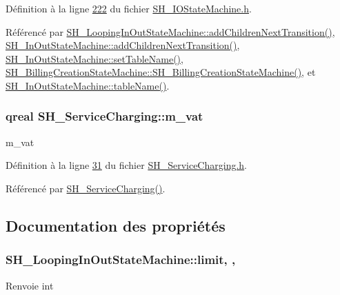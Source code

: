 Définition à la ligne \hyperlink{SH__IOStateMachine_8h_source_l00222}{222} du fichier \hyperlink{SH__IOStateMachine_8h_source}{S\-H\-\_\-\-I\-O\-State\-Machine.\-h}.



Référencé par \hyperlink{classSH__LoopingInOutStateMachine_abfae9f47019379f270496de46845c729}{S\-H\-\_\-\-Looping\-In\-Out\-State\-Machine\-::add\-Children\-Next\-Transition()}, \hyperlink{classSH__InOutStateMachine_aa78420f8778d7777809aad77eb8473b4}{S\-H\-\_\-\-In\-Out\-State\-Machine\-::add\-Children\-Next\-Transition()}, \hyperlink{classSH__InOutStateMachine_a95db31a7e7f31f36a8737adc739ab08c}{S\-H\-\_\-\-In\-Out\-State\-Machine\-::set\-Table\-Name()}, \hyperlink{classSH__BillingCreationStateMachine_ad62b77fa4aeafe200056ff3974562f83}{S\-H\-\_\-\-Billing\-Creation\-State\-Machine\-::\-S\-H\-\_\-\-Billing\-Creation\-State\-Machine()}, et \hyperlink{classSH__InOutStateMachine_a4288a6c86ddf83effefff886675591c9}{S\-H\-\_\-\-In\-Out\-State\-Machine\-::table\-Name()}.

\hypertarget{classSH__ServiceCharging_ae2fa75c56883dc4af6b0bbcbb86d0861}{
\subsubsection[{m\-\_\-vat}]{\setlength{\rightskip}{0pt plus 5cm}qreal S\-H\-\_\-\-Service\-Charging\-::m\-\_\-vat\hspace{0.3cm}{\ttfamily [private]}}}\label{classSH__ServiceCharging_ae2fa75c56883dc4af6b0bbcbb86d0861}


m\-\_\-vat 



Définition à la ligne \hyperlink{SH__ServiceCharging_8h_source_l00031}{31} du fichier \hyperlink{SH__ServiceCharging_8h_source}{S\-H\-\_\-\-Service\-Charging.\-h}.



Référencé par \hyperlink{classSH__ServiceCharging_afa5273d046049b1c2b020a6a19a8290b}{S\-H\-\_\-\-Service\-Charging()}.



\subsection{Documentation des propriétés}
\hypertarget{classSH__LoopingInOutStateMachine_a7b61682544bd06b52020df3e0d801d21}{
\subsubsection[{limit}]{\setlength{\rightskip}{0pt plus 5cm}S\-H\-\_\-\-Looping\-In\-Out\-State\-Machine\-::limit\hspace{0.3cm}{\ttfamily [read]}, {\ttfamily [write]}, {\ttfamily [inherited]}}}\label{classSH__LoopingInOutStateMachine_a7b61682544bd06b52020df3e0d801d21}
\begin{DoxyReturn}{Renvoie}
int 
\end{DoxyReturn}


